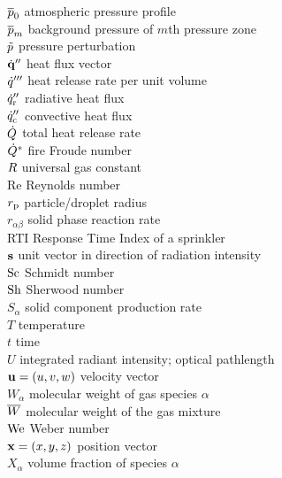 \begin{tabbing}
$\overline{p}_0$                   \> atmospheric pressure profile \\
$\overline{p}_m$                   \> background pressure of $m$th pressure zone \\
$\tilde{p}$                     \> pressure perturbation \\
$\dot{\mathbf{q}}''$                  \> heat flux vector \\
$\dot{q}'''$                  \> heat release rate per unit volume \\
$\dot{q}_{\rm r}''$           \> radiative heat flux \\
$\dot{q}_{\rm c}''$           \> convective heat flux \\
$\dot{Q}$                     \> total heat release rate \\
$\dot{Q}^*$                   \> fire Froude number \\
$R$                      \> universal gas constant \\
Re                        \> Reynolds number \\
$r_{\rm p}$               \> particle/droplet radius \\
$r_{\alpha\beta}$         \> solid phase reaction rate \\
RTI                       \> Response Time Index of a sprinkler \\
${\mathbf{s}}$                     \> unit vector in direction of radiation intensity \\
$\hbox{Sc}$                     \> Schmidt number \\
$\hbox{Sh}$                     \> Sherwood number \\
$S_\alpha$                \> solid component production rate \\
$T$                       \> temperature \\
$t$                       \> time           \\
$U$                       \> integrated radiant intensity; optical pathlength \\
${\mathbf{u}}=(u,v,w)$             \> velocity vector  \\
$W_\alpha$                \> molecular weight of gas species $\alpha$ \\
$\overline{W}$                     \> molecular weight of the gas mixture \\
$\hbox{We}$                     \> Weber number \\
${\mathbf{x}}=(x,y,z)$             \> position vector  \\
$X_\alpha$                \> volume fraction of species $\alpha$   \\

\end{tabbing}
